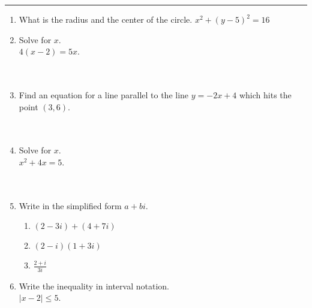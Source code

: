 \documentclass[11pt]{article}
\begin{document}
\Large


\medskip\hrule
\vspace{10pt}

\begin{enumerate}

\item What is the radius and the center of the circle.
\hspace{\parindent} $x^2 + (y-5)^2 = 16$ \\

\item Solve for $x$. \\
\hspace{\parindent} $4(x-2) = 5x$.
\\
\\
\\

\item Find an equation for a line parallel to the line $y=-2x+4$ which hits the point $(3,6)$.
\\
\\
\\

\item Solve for $x$. \\
\hspace{\parindent} $x^2 + 4x = 5$.
\\
\\
\\

\item Write in the simplified form $a + bi$.
\begin{enumerate}
    \item $(2-3i) + (4+7i)$ \\
    \item $(2-i)(1+3i)$ \\
    \item $\frac{2+i}{3i}$ \\
\end{enumerate}

\item Write the inequality in interval notation. \\ 
\hspace{\parindent} $|x-2| \leq 5$.

\end{enumerate}
\end{document}
